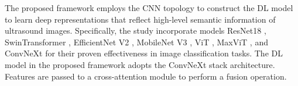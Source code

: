 


The proposed framework employs the CNN topology to construct the DL model to learn deep representations that reflect high-level semantic information of ultrasound images. Specifically, the study incorporate models ResNet18 \cite{resnet}, SwinTransformer \cite{Liu:2022b}, EfficientNet V2 \cite{Tan:2021}, MobileNet V3 \cite{Howard:2019}, ViT \cite{Dosovitskiy:2020_b}, MaxViT \cite{Tu:2022}, and ConvNeXt \cite{Liu:2022} for their proven effectiveness in image classification tasks. %
The DL model in the proposed framework adopts the ConvNeXt stack architecture. Features are passed to a cross-attention module to perform a fusion operation. 



